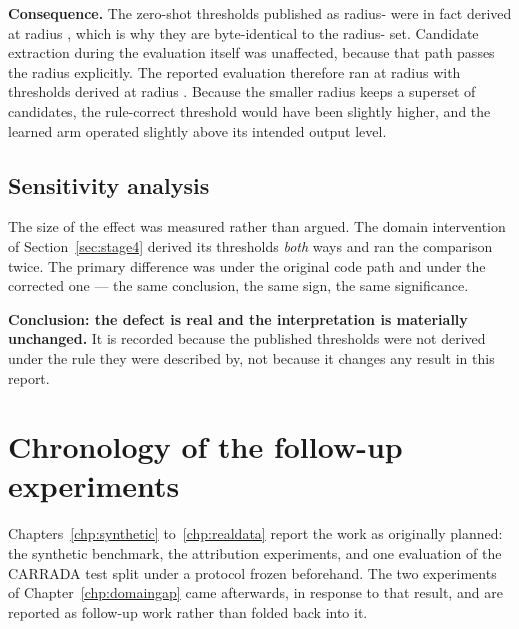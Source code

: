\textbf{Consequence.} The zero-shot thresholds published as radius-\ProtocolNms{} were in fact
derived at radius \ProtocolNmsOriginal{}, which is why they are byte-identical to the
radius-\ProtocolNmsOriginal{} set. Candidate extraction during the evaluation itself was unaffected,
because that path passes the radius explicitly. The reported evaluation therefore ran at radius
\ProtocolNms{} with thresholds derived at radius \ProtocolNmsOriginal{}. Because the smaller radius
keeps a superset of candidates, the rule-correct threshold would have been slightly higher, and the
learned arm operated slightly above its intended output level.

\subsection*{Sensitivity analysis}

The size of the effect was measured rather than argued. The domain intervention of
Section~\ref{sec:stage4} derived its thresholds \emph{both} ways and ran the comparison twice. The
primary difference was \CiTestDelta{} under the original code path and \CiTestDeltaRtwo{} under the
corrected one --- the same conclusion, the same sign, the same significance.

\textbf{Conclusion: the defect is real and the interpretation is materially unchanged.} It is
recorded because the published thresholds were not derived under the rule they were described by,
not because it changes any result in this report.

\section{Chronology of the follow-up experiments}

Chapters~\ref{chp:synthetic} to~\ref{chp:realdata} report the work as originally planned: the
synthetic benchmark, the attribution experiments, and one evaluation of the CARRADA test split under
a protocol frozen beforehand. The two experiments of Chapter~\ref{chp:domaingap} came afterwards, in
response to that result, and are reported as follow-up work rather than folded back into it.

